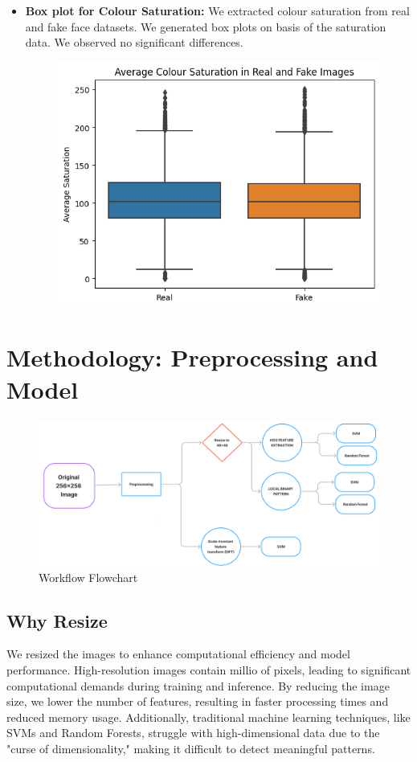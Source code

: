 \documentclass[10pt,twocolumn,letterpaper]{article}
\begin{document}
\begin{itemize}
    \item \textbf{Box plot for Colour Saturation:} We extracted colour saturation from real and fake face datasets. We generated box plots on basis of the saturation data. We observed no significant differences.
    \begin{figure}[h]
    \centering
    \includegraphics[scale=0.4]{6.png}
    \end{figure}

\end{itemize}


\section{Methodology: Preprocessing and Model}
\begin{figure}[h]
    \centering
    \includegraphics[width=\linewidth]{1.png}
    \caption{Workflow Flowchart}
\end{figure}
\subsection{Why Resize}
We resized the images to enhance computational efficiency and model performance. High-resolution images contain millio of pixels, leading to significant computational demands during training and inference. By reducing the image size, we lower the number of features, resulting in faster processing times and reduced memory usage. Additionally, traditional machine learning techniques, like SVMs and Random Forests, struggle with high-dimensional data due to the "curse of dimensionality," making it difficult to detect meaningful patterns.
\end{document}

